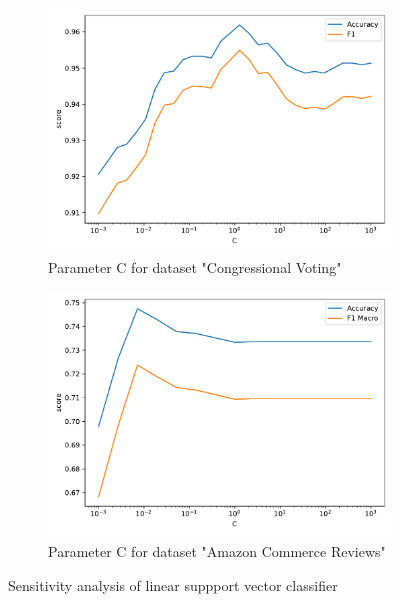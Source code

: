 \documentclass[a4paper,10pt]{article}
\begin{document}
\begin{figure}[h!]
    \captionsetup{justification=centering}
    \begin{subfigure}[b]{0.45\textwidth}
        \includegraphics[width=\textwidth]{congress/plots/LinearSVC_C_sensitivity_new.pdf}
        \caption{Parameter \textsf{C} for dataset "Congressional Voting"}
    \end{subfigure}
    \hfill
    \begin{subfigure}[b]{0.45\textwidth}
        \includegraphics[width=\textwidth]{amazon/plots/LinearSVC_C_sensitivity.pdf}
        \caption{Parameter \textsf{C} for dataset "Amazon Commerce Reviews"}
    \end{subfigure}
    \caption{Sensitivity analysis of linear suppport vector classifier}
    \label{fig: sensitivity lsvc}
\end{figure}
\end{document}
